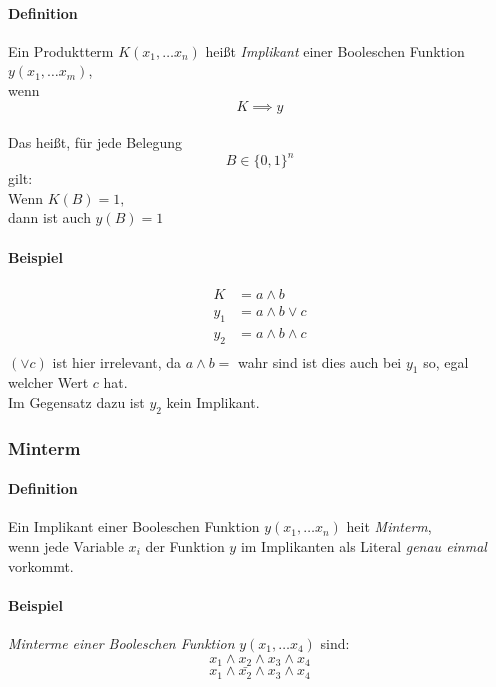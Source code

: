 \documentclass[a4paper]{scrartcl}
\begin{document}
			\paragraph{Definition}
			Ein Produktterm \( K(x_1, \dots x_n) \) heißt \emph{Implikant} einer Booleschen Funktion \( y(x_1, \dots x_m) \), \\
			wenn \[ K \implies y \] \\
			Das heißt, für jede Belegung  \[B \in \{ 0, 1 \}^n \] gilt:\\
			Wenn \( K(B ) = 1, \)\\
			dann ist auch \( y(B) = 1 \)\\
			
			\paragraph{Beispiel}
			\begin{align*}
				K &= a \wedge b \\
				y_1 &= a \wedge b \vee c\\
				y_2 &= a \wedge b \wedge c\\
			\end{align*}
			\( (\vee c )\) ist hier irrelevant, da \( a \wedge b = \) wahr sind ist dies auch bei \(y_1 \) so, egal welcher Wert \( c \) hat. \\
			Im Gegensatz dazu ist \( y_2 \) kein Implikant.\\
			
			\subsubsection{Minterm}
			\paragraph{Definition}
			Ein Implikant einer Booleschen Funktion \( y(x_1, \dots x_n) \) heit \emph{Minterm},\\
			wenn jede Variable \( x_i \) der Funktion \(y\) im Implikanten als Literal \emph{genau einmal} vorkommt.
			
			\paragraph{Beispiel}
			\emph{Minterme einer Booleschen Funktion } \( y(x_1, \dots x_4) \) sind:\\
			\[ x_1 \wedge x_2 \wedge x_3 \wedge x_4 \]
			\[ x_1 \wedge \bar{x_2} \wedge x_3 \wedge x_4 \]
			
\end{document}
